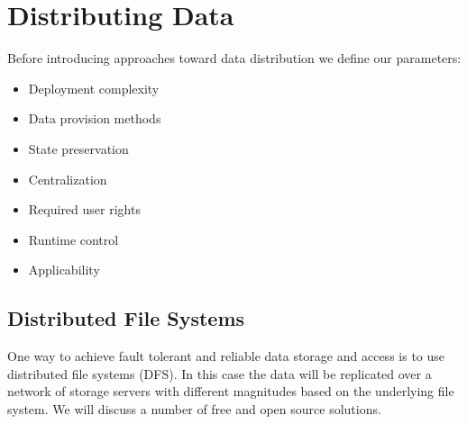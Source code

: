 \section{Distributing Data}
Before introducing approaches toward data distribution we define our parameters:
\begin{itemize}
\item Deployment complexity
\item Data provision methods
\item State preservation
\item Centralization
\item Required user rights
\item Runtime control
\item Applicability
\end{itemize}

\subsection{Distributed File Systems}
One way to achieve fault tolerant and reliable data storage and access is to use
distributed file systems (DFS). In this case the data will be replicated over a
network of storage servers with different magnitudes based on the underlying file
system. We will discuss a number of free and open source solutions.

